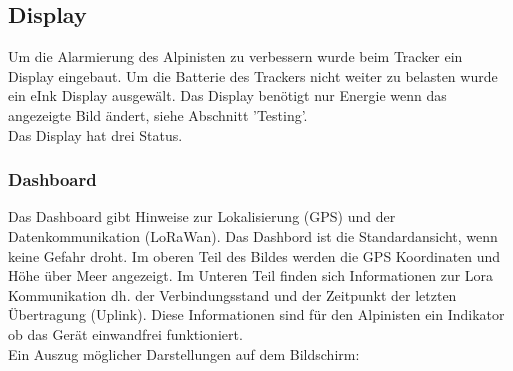 \documentclass[11pt,english,german]{report}
\theoremstyle{definition}
\begin{document}
\newpage
\subsection{Display}
Um die Alarmierung des Alpinisten zu verbessern wurde beim Tracker ein Display eingebaut. Um die Batterie des Trackers nicht weiter zu belasten wurde ein eInk Display ausgewält. Das Display benötigt nur Energie wenn das angezeigte Bild ändert, siehe Abschnitt 'Testing'.\\[0.3cm]
Das Display hat drei Status.
\subsubsection{Dashboard}
Das Dashboard gibt Hinweise zur Lokalisierung (GPS) und der Datenkommunikation (LoRaWan). Das Dashbord ist die Standardansicht, wenn keine Gefahr droht. Im oberen Teil des Bildes werden die GPS Koordinaten und Höhe über Meer angezeigt. Im Unteren Teil finden sich Informationen zur Lora Kommunikation dh. der Verbindungsstand und der Zeitpunkt der letzten Übertragung (Uplink). Diese Informationen sind für den Alpinisten ein Indikator ob das Gerät einwandfrei funktioniert.\\[0.3cm]
Ein Auszug möglicher Darstellungen auf dem Bildschirm:
\end{document}
